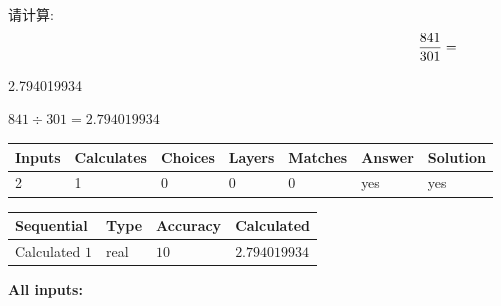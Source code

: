 \documentclass{ctexart}
\begin{document}
  
 
请计算:
\begin{equation}
\frac { %
841 }  {  %
301} = \nonumber
\end{equation}
 
 
 
\noindent{}
 
 

2.794019934
 
 
\noindent{}
 
 

 
 
 
\noindent{}
 
 

$ %
841 \div  %
301=   %
2.794019934$
 
 
\noindent{}
 
 

 
   
   
   
   
\noindent\begin{tabular}{|l|l|l|l|l|l|l|}
 \hline
Inputs & Calculates & Choices & Layers & Matches & Answer & Solution \\ \hline
 2  & 
 1  & 
 0
  & 
 0  & 
 0  & 
  yes & 
  yes 
  \\ \hline
 \end{tabular}
   
   
   
   
\noindent{}
   
   
  
  
\noindent\begin{tabular}{|l|l|l|l|}
\hline
 Sequential & Type & Accuracy & Calculated \\ 
\hline
 
 
  Calculated $  1 $ & real & $  10  $ & 
 $ 2.794019934 $ 
 \\  \hline  
 \end{tabular}
   
   
   
   
\noindent\vspace{0.1in}\hspace{-0.08in} {\textbf{\Large{All inputs: }}}
   
\end{document}
